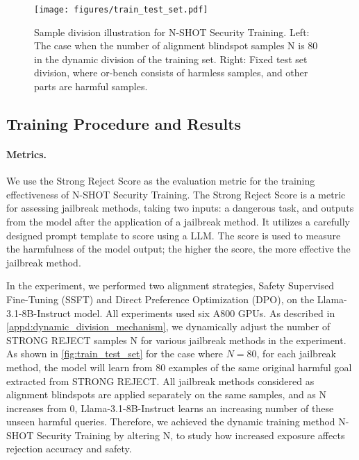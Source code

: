 \begin{figure}[h]
\centering
\texttt{[image: figures/train\_test\_set.pdf]}
\vspace{-1em}
\caption{Sample division illustration for N-SHOT Security Training.
Left: The case when the number of alignment blindspot samples N is 80 in the dynamic division of the training set.
Right: Fixed test set division, where or-bench consists of harmless samples, and other parts are harmful samples.}
\label{fig:train_test_set}
\end{figure}

\subsection{Training Procedure and Results}

\paragraph{Metrics.}
We use the Strong Reject Score \cite{ding2023wolf} as the evaluation metric for the training effectiveness of N-SHOT Security Training.
The Strong Reject Score is a metric for assessing jailbreak methods, taking two inputs: a dangerous task, and outputs from the model after the application of a jailbreak method.
It utilizes a carefully designed prompt template to score using a LLM. The score is used to measure the harmfulness of the model output; the higher the score, the more effective the jailbreak method.

\label{appd:training_procedure}
In the experiment, we performed two alignment strategies, Safety Supervised Fine-Tuning (SSFT) and Direct Preference Optimization (DPO), on the Llama-3.1-8B-Instruct model. All experiments used six A800 GPUs.
As described in \autoref{appd:dynamic_division_mechanism}, we dynamically adjust the number of STRONG REJECT samples N for various jailbreak methods in the experiment.
As shown in \autoref{fig:train_test_set} for the case where \(N=80\), for each jailbreak method, the model will learn from 80 examples of the same original harmful goal extracted from STRONG REJECT.
All jailbreak methods considered as alignment blindspots are applied separately on the same samples, and as N increases from 0, Llama-3.1-8B-Instruct learns an increasing number of these unseen harmful queries.
Therefore, we achieved the dynamic training method N-SHOT Security Training by altering N, to study how increased exposure affects rejection accuracy and safety.

